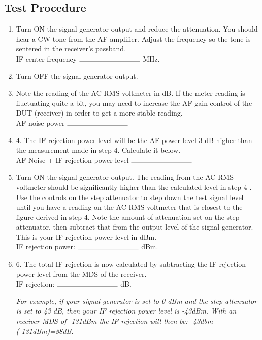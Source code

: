 \documentclass[10pt,letterpaper]{book}
\begin{document}
\subsection*{Test Procedure}
\begin{enumerate}
	\item Turn ON the signal generator output and reduce the attenuation. You should hear a CW tone from the AF amplifier. Adjust the frequency so the tone is sentered in the receiver's passband.
	\vspace{30pt}
	\\IF center frequency $\rule{3cm}{0.1mm}$ MHz.

	\item Turn OFF the signal generator output.

	\item Note the reading of the AC RMS voltmeter in dB. If the meter reading is fluctuating quite a bit, you may need to increase the AF gain control of the DUT (receiver) in order to get a more stable reading.
	\vspace{30pt}
	\\AF noise power $\rule{3cm}{0.1mm}$ 

	\item 4. The IF rejection power level will be the AF power level 3 dB higher than the measurement made in step 4. Calculate it below.
	\vspace{30pt}
	\\AF Noise + IF rejection power level $\rule{3cm}{0.1mm}$ 

	\item Turn ON the signal generator output. The reading from the AC RMS voltmeter should be significantly higher than the calculated level in step 4 . Use the controls on the step attenuator to step down the test signal level until you have a reading on the AC RMS voltmeter that is closest to the figure derived in step 4. Note the amount of attenuation set on the step attenuator, then subtract that from the output level of the signal generator. This is your IF rejection power level in dBm.
	\vspace{30pt}
	\\IF rejection power: $\rule{3cm}{0.1mm}$ dBm.
	 
	\item 6. The total IF rejection is now calculated by subtracting the IF rejection power level from the MDS of the receiver.
	\vspace{30pt}
	 \\IF rejection: $\rule{3cm}{0.1mm}$ dB.

	\emph{For example, if your signal generator is set to 0 dBm and the step attenuator is set to 43 dB, then your IF rejection power level is -43dBm. With an receiver MDS of -131dBm the IF rejection will then be: -43dbm -(-131dBm)=88dB.}
\end{enumerate}
\end{document}
